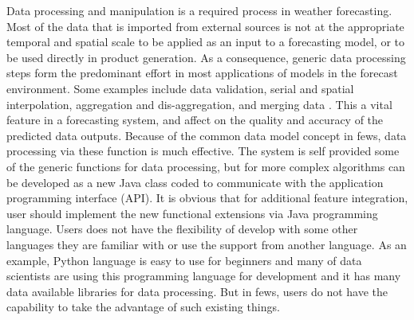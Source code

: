 Data processing and manipulation is a required process in weather forecasting. Most of the data that is imported from external sources is not at the appropriate temporal and spatial scale to be applied as an input to a forecasting model, or to be used directly in product generation. As a consequence, generic data processing steps form the predominant effort in most applications of models in the forecast environment. Some examples include data validation, serial and spatial interpolation, aggregation and dis-aggregation, and merging data \cite{Werner2013TheSystem}. This a vital feature in a forecasting system, and affect on the quality and accuracy of the predicted data outputs. Because of the common data model concept in \acrshort{fews}, data processing via these function is much effective. The system is self provided some of the generic functions for data processing, but for more complex algorithms can be developed as a new Java class coded to communicate with the {application programming interface (API)}. It is obvious that for additional feature integration, user should implement the new functional extensions via Java programming language. Users does not have the flexibility of develop with some other languages they are familiar with or use the support from another language. As an example, Python language is easy to use for beginners and many of data scientists are using this programming language for development and it has many data available libraries for data processing. But in \acrshort{fews}, users do not have the capability to take the advantage of such existing things.


